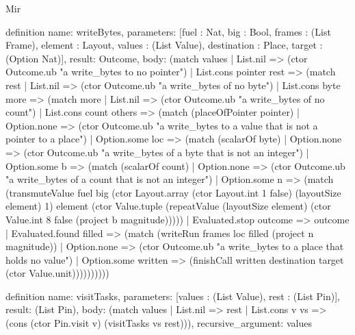 \begin{lexlean}{Mir}
\begin{semanticmodule}
definition{
  name: writeBytes,
  parameters: [fuel : Nat, big : Bool, frames : (List Frame), element : Layout, values : (List Value), destination : Place, target : (Option Nat)],
  result: Outcome,
  body: (match values
    | List.nil => (ctor Outcome.ub "a write_bytes to no pointer")
    | List.cons pointer rest => (match rest
      | List.nil => (ctor Outcome.ub "a write_bytes of no byte")
      | List.cons byte more => (match more
        | List.nil => (ctor Outcome.ub "a write_bytes of no count")
        | List.cons count others => (match (placeOfPointer pointer)
          | Option.none => (ctor Outcome.ub "a write_bytes to a value that is not a pointer to a place")
          | Option.some loc => (match (scalarOf byte)
            | Option.none => (ctor Outcome.ub "a write_bytes of a byte that is not an integer")
            | Option.some b => (match (scalarOf count)
              | Option.none => (ctor Outcome.ub "a write_bytes of a count that is not an integer")
              | Option.some n => (match (transmuteValue fuel big (ctor Layout.array (ctor Layout.int 1 false) (layoutSize element) 1) element (ctor Value.tuple (repeatValue (layoutSize element) (ctor Value.int 8 false (project b magnitude)))))
                | Evaluated.stop outcome => outcome
                | Evaluated.found filled => (match (writeRun frames loc filled (project n magnitude))
                  | Option.none => (ctor Outcome.ub "a write_bytes to a place that holds no value")
                  | Option.some written => (finishCall written destination target (ctor Value.unit))))))))))
}

definition{
  name: visitTasks,
  parameters: [values : (List Value), rest : (List Pin)],
  result: (List Pin),
  body: (match values
    | List.nil => rest
    | List.cons v vs => (cons (ctor Pin.visit v) (visitTasks vs rest))),
  recursive_argument: values
}


\end{semanticmodule}
\end{lexlean}

